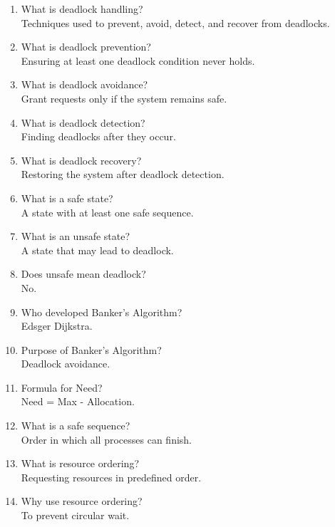 \begin{enumerate}
\item What is deadlock handling?\\
Techniques used to prevent, avoid, detect, and recover from deadlocks.

\item What is deadlock prevention?\\
Ensuring at least one deadlock condition never holds.

\item What is deadlock avoidance?\\
Grant requests only if the system remains safe.

\item What is deadlock detection?\\
Finding deadlocks after they occur.

\item What is deadlock recovery?\\
Restoring the system after deadlock detection.

\item What is a safe state?\\
A state with at least one safe sequence.

\item What is an unsafe state?\\
A state that may lead to deadlock.

\item Does unsafe mean deadlock?\\
No.

\item Who developed Banker's Algorithm?\\
Edsger Dijkstra.

\item Purpose of Banker's Algorithm?\\
Deadlock avoidance.

\item Formula for Need?\\
Need = Max - Allocation.

\item What is a safe sequence?\\
Order in which all processes can finish.

\item What is resource ordering?\\
Requesting resources in predefined order.

\item Why use resource ordering?\\
To prevent circular wait.


\end{enumerate}

